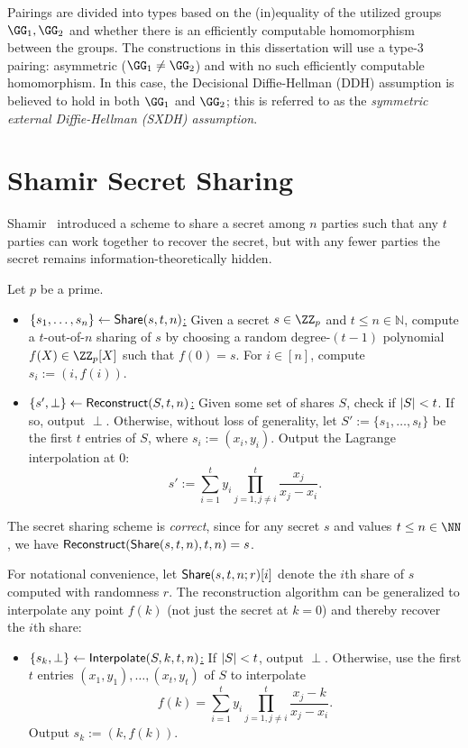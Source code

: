 Pairings are divided into types based on the (in)equality of the utilized groups $\GG_1,\GG_2$ and whether there is an efficiently computable homomorphism between the groups. The constructions in this dissertation will use a type-3 pairing: asymmetric ($\GG_1 \neq \GG_2$) and with no such efficiently computable homomorphism. In this case, the Decisional Diffie-Hellman (DDH) assumption is believed to hold in both $\GG_1$ and $\GG_2$; this is referred to as the \emph{symmetric external Diffie-Hellman (SXDH) assumption}.

\section{Shamir Secret Sharing}\label{sec:shamir}
Shamir~\cite{CACM:Shamir79} introduced a scheme to share a secret among $n$ parties such that any $t$ parties can work together to recover the secret, but with any fewer parties the secret remains information-theoretically hidden.

\begin{construction}
Let $p$ be a prime.
    \begin{itemize}
        \item \underline{$\{s_1, \dots, s_n\} \gets \mathsf{Share}(s, t, n)$:} Given a secret $s \in \ZZ_p$ and $t \leq n \in \mathbb{N}$, compute a $t$-out-of-$n$ sharing of $s$ by choosing a random degree-$(t-1)$ polynomial $f(X) \in \ZZ_p[X]$ such that $f(0) = s$. For $i \in [n]$, compute $s_i := (i, f(i))$.
        \item \underline{$\{s', \perp\} \gets \mathsf{Reconstruct}(S, t, n)$:} Given some set of shares $S$, check if $\lvert S \rvert < t$. If so, output $\perp$. Otherwise, without loss of generality, let $S' := \{s_1, \dots, s_t\}$ be the first $t$ entries of $S$, where $s_i := (x_i, y_i)$. Output the Lagrange interpolation at 0:
        \[
            s' := \sum_{i=1}^t y_i \prod_{j=1, j \neq i}^t \frac{x_j}{x_j - x_i}.
        \]
    \end{itemize}
\end{construction}

The secret sharing scheme is \emph{correct}, since for any secret $s$ and values $t \leq n \in \NN$, we have $\mathsf{Reconstruct}(\mathsf{Share}(s, t, n),\allowbreak t, n) = s$. 

For notational convenience, let $\mathsf{Share}(s,t,n; r)[i]$ denote the $i$th share of $s$ computed with randomness $r$. The reconstruction algorithm can be generalized to interpolate any point $f(k)$ (not just the secret at $k=0$) and thereby recover the $i$th share:
\begin{itemize}
    \item \underline{$\{s_k,\perp\} \gets {\sf Interpolate}(S, k, t, n)$:} If $\lvert S \rvert < t$, output $\perp$. Otherwise, use the first $t$ entries $(x_1, y_1), \dots,\allowbreak (x_t, y_t)$ of $S$ to interpolate
    \[
        f(k) = \sum_{i=1}^t y_i \prod_{j=1, j \neq i}^t \frac{x_j - k}{x_j - x_i}.
    \]
    Output $s_k := (k, f(k))$.
\end{itemize}

